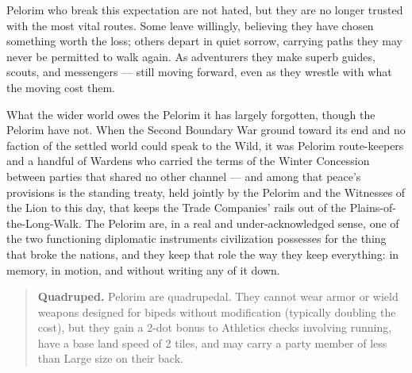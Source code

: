 Pelorim who break this expectation are not hated, but they are no longer trusted with the most vital routes. Some leave willingly, believing they have chosen something worth the loss; others depart in quiet sorrow, carrying paths they may never be permitted to walk again. As adventurers they make superb guides, scouts, and messengers --- still moving forward, even as they wrestle with what the moving cost them.

What the wider world owes the Pelorim it has largely forgotten, though the Pelorim have not. When the Second Boundary War ground toward its end and no faction of the settled world could speak to the Wild, it was Pelorim route-keepers and a handful of Wardens who carried the terms of the Winter Concession between parties that shared no other channel --- and among that peace's provisions is the standing treaty, held jointly by the Pelorim and the Witnesses of the Lion to this day, that keeps the Trade Companies' rails out of the Plains-of-the-Long-Walk. The Pelorim are, in a real and under-acknowledged sense, one of the two functioning diplomatic instruments civilization possesses for the thing that broke the nations, and they keep that role the way they keep everything: in memory, in motion, and without writing any of it down.

\begin{quote}
\textbf{Quadruped.} Pelorim are quadrupedal. They cannot wear armor or wield weapons designed for bipeds without modification (typically doubling the cost), but they gain a 2-dot bonus to Athletics checks involving running, have a base land speed of 2 tiles, and may carry a party member of less than Large size on their back.
\end{quote}
